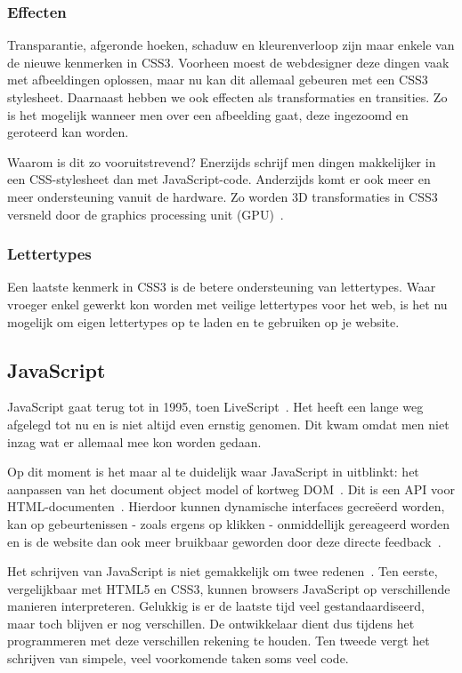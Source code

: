 \subsubsection{Effecten}
Transparantie, afgeronde hoeken, schaduw en kleurenverloop zijn maar enkele van de nieuwe kenmerken in CSS3. Voorheen moest de webdesigner deze dingen vaak met afbeeldingen oplossen, maar nu kan dit allemaal gebeuren met een CSS3 stylesheet. Daarnaast hebben we ook effecten als transformaties en transities. Zo is het mogelijk wanneer men over een afbeelding gaat, deze ingezoomd en geroteerd kan worden. 

Waarom is dit zo vooruitstrevend? Enerzijds schrijf men dingen makkelijker in een CSS-stylesheet dan met JavaScript-code. Anderzijds komt er ook meer en meer ondersteuning vanuit de hardware. Zo worden 3D transformaties in CSS3 versneld door de graphics processing unit (GPU)~\cite{Hales2012,Kool2012}.

\subsubsection{Lettertypes}
Een laatste kenmerk in CSS3 is de betere ondersteuning van lettertypes. Waar vroeger enkel gewerkt kon worden met veilige lettertypes voor het web, is het nu mogelijk om eigen lettertypes op te laden en te gebruiken op je website.

\subsection{JavaScript}
\label{ref:javascript}
JavaScript gaat terug tot in 1995, toen LiveScript~\cite{McFarland2011}. Het heeft een lange weg afgelegd tot nu en is niet altijd even ernstig genomen. Dit kwam omdat men niet inzag wat er allemaal mee kon worden gedaan. 

Op dit moment is het maar al te duidelijk waar JavaScript in uitblinkt: het aanpassen van het document object model of kortweg DOM~\cite{PhilDutson2012}. Dit is een API voor HTML-documenten~\cite{Hegaret2004}. Hierdoor kunnen dynamische interfaces gecreëerd worden, kan op gebeurtenissen - zoals ergens op klikken - onmiddellijk gereageerd worden en is de website dan ook meer bruikbaar geworden door deze directe feedback~\cite{McFarland2011}.

Het schrijven van JavaScript is niet gemakkelijk om twee redenen~\cite{McFarland2011}. Ten eerste, vergelijkbaar met HTML5 en CSS3, kunnen browsers JavaScript op verschillende manieren interpreteren. Gelukkig is er de laatste tijd veel gestandaardiseerd, maar toch blijven er nog verschillen. De ontwikkelaar dient dus tijdens het programmeren met deze verschillen rekening te houden. Ten tweede vergt het schrijven van simpele, veel voorkomende taken soms veel code.

